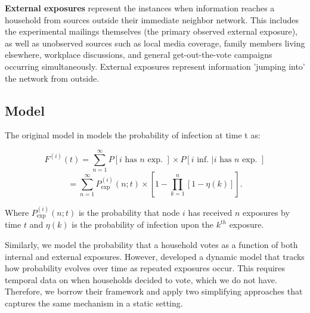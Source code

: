 \documentclass[11pt]{article}
\begin{document}
\textbf{External exposures} represent the instances when information reaches a household from sources outside their immediate neighbor network. This includes the experimental mailings themselves (the primary observed external exposure), as well as unobserved sources such as local media coverage, family members living elsewhere, workplace discussions, and general get-out-the-vote campaigns occurring simultaneously. External exposures represent information 'jumping into' the network from outside.

\subsection{Model}
The original model in \cite{myers_information_2012} models the probability of infection at time t as:

\begin{equation*}
    F^{(i)}(t) = \sum_{n=1}^{\infty} P[i \text{ has } n \text{ exp. }] \times P[i \text{ inf. } | i \text{ has } n \text{ exp. }]
\end{equation*}
\begin{equation*}
    = \sum_{n=1}^{\infty} P_{\exp}^{(i)}(n; t) \times \left[ 1 - \prod_{k=1}^{n} [1 - \eta(k)] \right].
\end{equation*}

Where $P_{\exp}^{(i)}(n; t)$ is the probability that node $i$ has received $n$ exposures by time $t$ and $\eta(k)$ is the probability of infection upon the $k^{th}$ exposure.

Similarly, we model the probability that a household votes as a function of both internal and external exposures. However, \cite{myers_information_2012} developed a dynamic model that tracks how probability evolves over time as repeated exposures occur. This requires temporal data on when households decided to vote, which we do not have. Therefore, we borrow their framework and apply two simplifying approaches that captures the same mechanism in a static setting.
\end{document}
